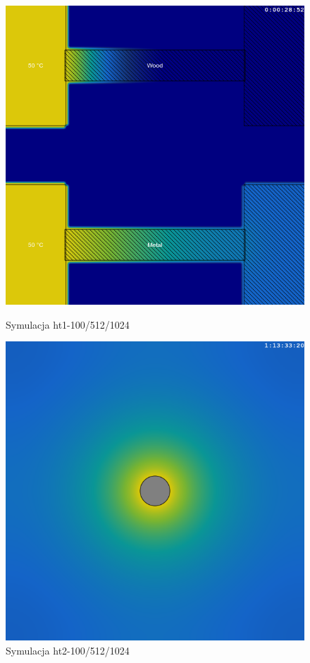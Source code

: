 \begin{figure}[!p]
\begin{minipage}[b]{0.47\linewidth}
\centering
\includegraphics[width=\textwidth]{img/perfCase/ht1}
\caption{Symulacja ht1-100/512/1024}
\label{fig:ht1}
\end{minipage}
\hspace{0.04\linewidth}
\begin{minipage}[b]{0.47\linewidth}
\centering
\includegraphics[width=\textwidth]{img/perfCase/ht2}
\caption{Symulacja ht2-100/512/1024}
\label{fig:ht2}
\end{minipage}
\end{figure}

